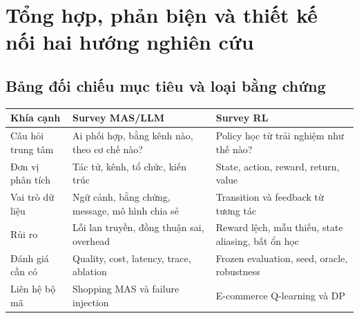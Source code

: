 \section{Tổng hợp, phản biện và thiết kế nối hai hướng nghiên
cứu}\label{tux1ed5ng-hux1ee3p-phux1ea3n-biux1ec7n-vuxe0-thiux1ebft-kux1ebf-nux1ed1i-hai-hux1b0ux1edbng-nghiuxean-cux1ee9u}

\subsection{Bảng đối chiếu mục tiêu và loại bằng
chứng}\label{bux1ea3ng-ux111ux1ed1i-chiux1ebfu-mux1ee5c-tiuxeau-vuxe0-loux1ea1i-bux1eb1ng-chux1ee9ng}

{\def\LTcaptype{none} %
\begin{longtable}[]{@{}
  >{\raggedright\arraybackslash}p{}
  >{\raggedright\arraybackslash}p{}
  >{\raggedright\arraybackslash}p{}@{}}
\toprule\noalign{}
\begin{minipage}[b]{\linewidth}\raggedright
Khía cạnh
\end{minipage} & \begin{minipage}[b]{\linewidth}\raggedright
Survey MAS/LLM
\end{minipage} & \begin{minipage}[b]{\linewidth}\raggedright
Survey RL
\end{minipage} \\
\midrule\noalign{}
\endhead
\bottomrule\noalign{}
\endlastfoot
Câu hỏi trung tâm & Ai phối hợp, bằng kênh nào, theo cơ chế nào? &
Policy học từ trải nghiệm như thế nào? \\
Đơn vị phân tích & Tác tử, kênh, tổ chức, kiến trúc & State, action,
reward, return, value \\
Vai trò dữ liệu & Ngữ cảnh, bằng chứng, message, mô hình chia sẻ &
Transition và feedback từ tương tác \\
Rủi ro & Lỗi lan truyền, đồng thuận sai, overhead & Reward lệch, mẫu
thiếu, state aliasing, bất ổn học \\
Đánh giá cần có & Quality, cost, latency, trace, ablation & Frozen
evaluation, seed, oracle, robustness \\
Liên hệ bộ mã & Shopping MAS và failure injection & E-commerce
Q-learning và DP \\
\end{longtable}
}

